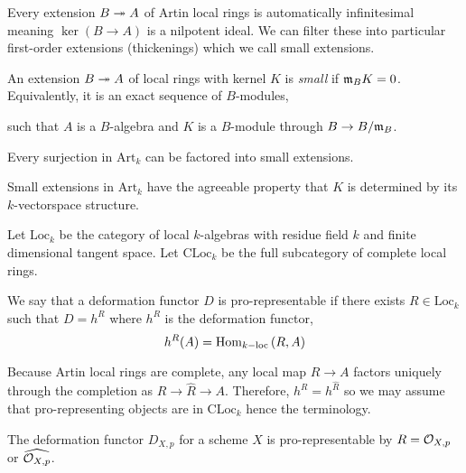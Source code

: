 \documentclass[12pt]{article}
\newcommand{\Art}{\mathrm{Art}}
\newcommand{\CLoc}{\mathrm{CLoc}}
\begin{document}
\begin{rmk}
Every extension $B \twoheadrightarrow A$ of Artin local rings is automatically infinitesimal meaning $\ker{(B \to A)}$ is a nilpotent ideal. We can filter these into particular first-order extensions (thickenings) which we call small extensions.
\end{rmk}

\begin{defn}
An extension $B \twoheadrightarrow A$ of local rings with kernel $K$ is \textit{small} if $\mathfrak{m}_B K = 0$. Equivalently, it is an exact sequence of $B$-modules,
\begin{center}
\end{center}
such that $A$ is a $B$-algebra and $K$ is a $B$-module through $B \to B / \mathfrak{m}_B$.
\end{defn}

\begin{prop}
Every surjection in $\Art_k$ can be factored into small extensions.
\end{prop}

\begin{rmk}
Small extensions in $\Art_k$ have the agreeable property that $K$ is determined by its $k$-vectorspace structure. 
\end{rmk}

\begin{defn}
Let $\mathrm{Loc}_k$ be the category of local $k$-algebras with residue field $k$ and finite dimensional tangent space. Let $\CLoc_k$ be the full subcategory of complete local rings.
\end{defn}

\begin{defn}
We say that a deformation functor $D$ is pro-representable if there exists $R \in \mathrm{Loc}_k$ such that $D = h^R$ where $h^R$ is the deformation functor,
\[ h^R(A) = \mathrm{Hom}_{k-\text{loc}} \left( R, A \right) \]
\end{defn}

\begin{rmk}
Because Artin local rings are complete, any local map $R \to A$ factors uniquely through the completion as $R \to \hat{R} \to A$. Therefore, $h^{R} = h^{\hat{R}}$ so we may assume that pro-representing objects are in $\CLoc_k$ hence the terminology.
\end{rmk}

\begin{rmk}
The deformation functor $D_{X,p}$ for a scheme $X$ is pro-representable by $R = \mathcal{O}_{X, p}$ or $\widehat{\mathcal{O}_{X, p}}$.
\end{rmk}
\end{document}
